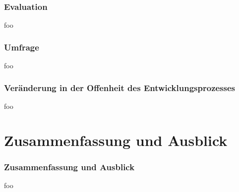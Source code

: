 \documentclass{beamer}
\begin{document}
\begin{frame}
\frametitle{Evaluation}
foo
\end{frame}

\begin{frame}
\frametitle{Umfrage}
foo
\end{frame}

\begin{frame}
\frametitle{Ver\"anderung in der Offenheit des Entwicklungsprozesses}
foo
\end{frame}

\section{Zusammenfassung und Ausblick}

\begin{frame}
\frametitle{Zusammenfassung und Ausblick}
foo
\end{frame}
\end{document}
